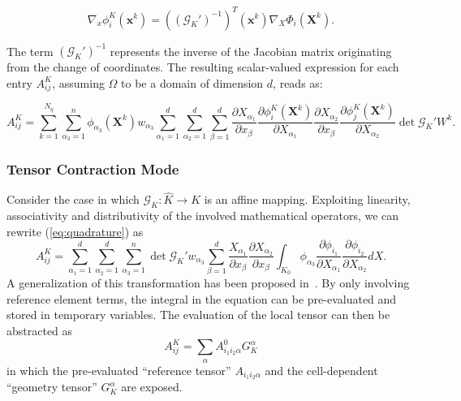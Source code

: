 \begin{equation}
\nabla_x \phi_i^K(\boldsymbol{x}^k) = ((\mathcal{G}_K')^{-1})^{T}(\boldsymbol{x}^k) \nabla_X \Phi_i(\boldsymbol{X}^k).
\end{equation}

The term $(\mathcal{G}_K')^{-1}$ represents the inverse of the Jacobian matrix originating from the change of coordinates. The resulting scalar-valued expression for each entry $A_{ij}^K$, assuming $\Omega$ to be a domain of dimension $d$, reads as:

\begin{equation}
\label{eq:quadrature}
A_{ij}^K = \sum_{k=1}^{N_q} \sum_{\alpha_3=1}^n \phi_{\alpha_3}(\boldsymbol{X}^k) w_{\alpha_3} \sum_{\alpha_1=1}^d \sum_{\alpha_2=1}^d \sum_{\beta=1}^d \frac{\partial X_{\alpha_1}}{\partial x_{\beta}} \frac{\partial \phi_i^K(\boldsymbol{X}^k)}{\partial X_{\alpha_1}} \frac{\partial X_{\alpha_2}}{\partial x_{\beta}} \frac{\partial \phi_j^K(\boldsymbol{X}^k)}{\partial X_{\alpha_2}} \operatorname{det} \mathcal{G}_K' W^k.
\end{equation}


\subsubsection{Tensor Contraction Mode}
Consider the case in which $\mathcal{G}_K : \hat{K} \rightarrow K$ is an affine mapping. Exploiting linearity, associativity and distributivity of the involved mathematical operators, we can rewrite (\ref{eq:quadrature}) as
\begin{equation}
\label{eq:tensor}
A_{ij}^K = \sum_{\alpha_1=1}^d \sum_{\alpha_2=1}^d \sum_{\alpha_3=1}^n \operatorname{det} \mathcal{G}_K' w_{\alpha_3} \sum_{\beta=1}^d \frac{X_{\alpha_1}}{\partial x_{\beta}} \frac{\partial X_{\alpha_2}}{\partial x_{\beta}} \int_{K_0} \phi_{\alpha_3} \frac{\partial \phi_{i_1}}{\partial X_{\alpha_1}} \frac{\partial \phi_{i_2}}{\partial X_{\alpha_2}} dX.
\end{equation}
A generalization of this transformation has been proposed in~\cite{FFC-TC}. By only involving reference element terms, the integral in the equation can be pre-evaluated and stored in temporary variables. The evaluation of the local tensor can then be abstracted as
\begin{equation}
A_{ij}^K = \sum_{\alpha} A_{i_1 i_2 \alpha}^0 G_{K}^\alpha
\end{equation}
in which the pre-evaluated ``reference tensor'' $A_{i_1 i_2 \alpha}$ and the cell-dependent ``geometry tensor'' $G_{K}^\alpha$ are exposed. 



